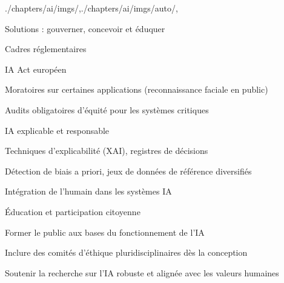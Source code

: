 \begin{graphicspathcontext}{{./chapters/ai/imgs/},{./chapters/ai/imgs/auto/},\old}

\begin{frame}[t]{Solutions : gouverner, concevoir et éduquer}
	\smaller
	\begin{block}{Cadres réglementaires}
		\begin{compactitemize}
		\item IA Act européen
		\item Moratoires sur certaines applications (reconnaissance faciale en public)
		\item Audits obligatoires d'équité pour les systèmes critiques
		\end{compactitemize}
	\end{block}
	\begin{block}{IA explicable et responsable}
		\begin{compactitemize}
		\item Techniques d'explicabilité (XAI), registres de décisions
		\item Détection de biais a priori, jeux de données de référence diversifiés
		\item Intégration de l'humain dans les systèmes IA
		\end{compactitemize}
	\end{block}
	\begin{block}{Éducation et participation citoyenne}
		\begin{compactitemize}
		\item Former le public aux bases du fonctionnement de l'IA
		\item Inclure des comités d'éthique pluridisciplinaires dès la conception
		\item Soutenir la recherche sur l'IA robuste et alignée avec les valeurs humaines
		\end{compactitemize}
	\end{block}
\end{frame}

\end{graphicspathcontext}

\endinput
